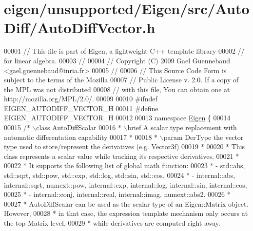 \hypertarget{eigen_2unsupported_2_eigen_2src_2_auto_diff_2_auto_diff_vector_8h_source}{}\section{eigen/unsupported/\+Eigen/src/\+Auto\+Diff/\+Auto\+Diff\+Vector.h}
\label{eigen_2unsupported_2_eigen_2src_2_auto_diff_2_auto_diff_vector_8h_source}

\begin{DoxyCode}
00001 \textcolor{comment}{// This file is part of Eigen, a lightweight C++ template library}
00002 \textcolor{comment}{// for linear algebra.}
00003 \textcolor{comment}{//}
00004 \textcolor{comment}{// Copyright (C) 2009 Gael Guennebaud <gael.guennebaud@inria.fr>}
00005 \textcolor{comment}{//}
00006 \textcolor{comment}{// This Source Code Form is subject to the terms of the Mozilla}
00007 \textcolor{comment}{// Public License v. 2.0. If a copy of the MPL was not distributed}
00008 \textcolor{comment}{// with this file, You can obtain one at http://mozilla.org/MPL/2.0/.}
00009 
00010 \textcolor{preprocessor}{#ifndef EIGEN\_AUTODIFF\_VECTOR\_H}
00011 \textcolor{preprocessor}{#define EIGEN\_AUTODIFF\_VECTOR\_H}
00012 
00013 \textcolor{keyword}{namespace }\hyperlink{namespace_eigen}{Eigen} \{
00014 
00015 \textcolor{comment}{/* \(\backslash\)class AutoDiffScalar}
00016 \textcolor{comment}{  * \(\backslash\)brief A scalar type replacement with automatic differentation capability}
00017 \textcolor{comment}{  *}
00018 \textcolor{comment}{  * \(\backslash\)param DerType the vector type used to store/represent the derivatives (e.g. Vector3f)}
00019 \textcolor{comment}{  *}
00020 \textcolor{comment}{  * This class represents a scalar value while tracking its respective derivatives.}
00021 \textcolor{comment}{  *}
00022 \textcolor{comment}{  * It supports the following list of global math function:}
00023 \textcolor{comment}{  *  - std::abs, std::sqrt, std::pow, std::exp, std::log, std::sin, std::cos,}
00024 \textcolor{comment}{  *  - internal::abs, internal::sqrt, numext::pow, internal::exp, internal::log, internal::sin,
       internal::cos,}
00025 \textcolor{comment}{  *  - internal::conj, internal::real, internal::imag, numext::abs2.}
00026 \textcolor{comment}{  *}
00027 \textcolor{comment}{  * AutoDiffScalar can be used as the scalar type of an Eigen::Matrix object. However,}
00028 \textcolor{comment}{  * in that case, the expression template mechanism only occurs at the top Matrix level,}
00029 \textcolor{comment}{  * while derivatives are computed right away.}

\end{DoxyCode}
